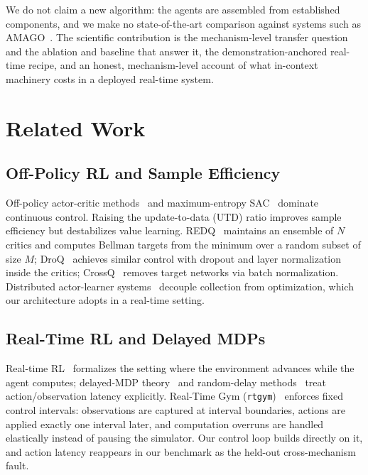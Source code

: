 \documentclass[conference]{IEEEtran}
\begin{document}
We do not claim a new algorithm: the agents are assembled from established components, and we make no state-of-the-art comparison against systems such as AMAGO~\cite{amago}. The scientific contribution is the mechanism-level transfer question and the ablation and baseline that answer it, the demonstration-anchored real-time recipe, and an honest, mechanism-level account of what in-context machinery costs in a deployed real-time system.

\section{Related Work}
\label{sec:related_work}

\subsection{Off-Policy RL and Sample Efficiency}
Off-policy actor-critic methods~\cite{ddpg,td3} and maximum-entropy SAC~\cite{sac} dominate continuous control. Raising the update-to-data (UTD) ratio improves sample efficiency but destabilizes value learning. REDQ~\cite{redq} maintains an ensemble of $N$ critics and computes Bellman targets from the minimum over a random subset of size $M$; DroQ~\cite{droq} achieves similar control with dropout and layer normalization inside the critics; CrossQ~\cite{crossq} removes target networks via batch normalization. Distributed actor-learner systems~\cite{apex} decouple collection from optimization, which our architecture adopts in a real-time setting.

\subsection{Real-Time RL and Delayed MDPs}
Real-time RL~\cite{rtrl} formalizes the setting where the environment advances while the agent computes; delayed-MDP theory~\cite{delayedmdp} and random-delay methods~\cite{bouteiller2021delays} treat action/observation latency explicitly. Real-Time Gym (\texttt{rtgym})~\cite{rtgym} enforces fixed control intervals: observations are captured at interval boundaries, actions are applied exactly one interval later, and computation overruns are handled elastically instead of pausing the simulator. Our control loop builds directly on it, and action latency reappears in our benchmark as the held-out cross-mechanism fault.
\end{document}
